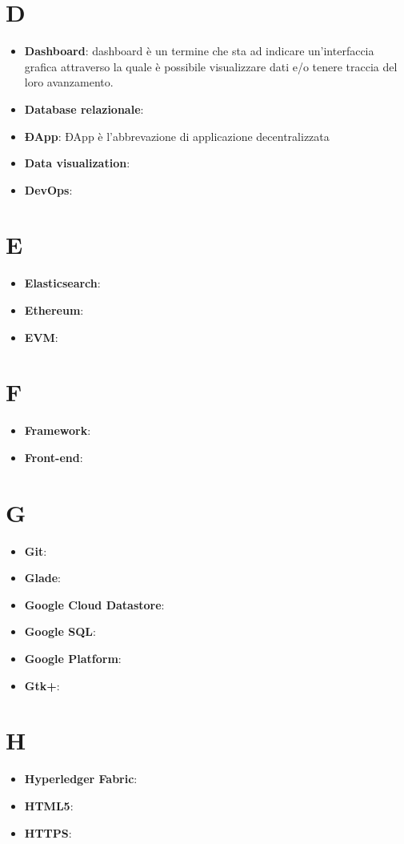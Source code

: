 \documentclass[a4paper, oneside, openany]{article}
\begin{document}
\section{D}
\begin{itemize}
\item \textbf{Dashboard}: dashboard è un termine che sta ad indicare un'interfaccia grafica attraverso la quale è possibile visualizzare dati e/o tenere traccia del loro avanzamento.
\item \textbf{Database relazionale}:
\item \textbf{ÐApp}: ÐApp è l'abbrevazione di applicazione decentralizzata
\item \textbf{Data visualization}:
\item \textbf{DevOps}:
\end{itemize}

\section{E}
\begin{itemize}
\item \textbf{Elasticsearch}:
\item \textbf{Ethereum}: 
\item \textbf{EVM}:
\end{itemize}

\section{F}
\begin{itemize}
\item \textbf{Framework}:
\item \textbf{Front-end}:
\end{itemize}

\section{G}
\begin{itemize}
\item \textbf{Git}:
\item \textbf{Glade}:
\item \textbf{Google Cloud Datastore}:
\item \textbf{Google SQL}:
\item \textbf{Google Platform}:
\item \textbf{Gtk+}:
\end{itemize}

\section{H}
\begin{itemize}
\item \textbf{Hyperledger Fabric}:
\item \textbf{HTML5}:
\item \textbf{HTTPS}:
\end{itemize}
\end{document}
